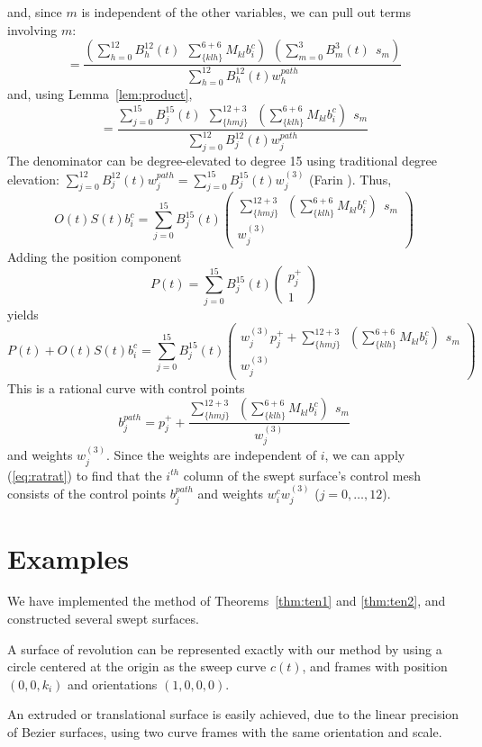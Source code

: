 and, since $m$ is independent of the other variables, 
we can pull out terms involving $m$:
\[
 = \frac{(\sum_{h=0}^{12} B_h^{12}(t) \ \ \sum_{\{klh\}}^{6+6} M_{kl} b_i^c) 
	\ \ (\sum_{m=0}^3 B_m^3(t) \ \ s_m)}
     {\sum_{h=0}^{12} B_h^{12}(t) w_h^{path}}
\]
and, using Lemma~\ref{lem:product},
\[
= \frac{\sum_{j=0}^{15} B_j^{15}(t) \ \ \sum_{\{hmj\}}^{12+3} \ \ 
		(\sum_{\{klh\}}^{6+6} M_{kl} b_i^c) \ \ s_m}
     {\sum_{j=0}^{12} B_j^{12}(t) w_j^{path}}
\]
The denominator can be degree-elevated to degree 15 using 
traditional degree elevation:
$\sum_{j=0}^{12} B_j^{12}(t) w_j^{path} = 
 \sum_{j=0}^{15} B_j^{15}(t) w^{(3)}_j$ (Farin \cite{farin93}).
Thus,
\[
O(t)S(t)b_i^c = \sum_{j=0}^{15} B_j^{15}(t) 
	\left(	\begin{array}{c}
	\sum_{\{hmj\}}^{12+3} \ \ 
		(\sum_{\{klh\}}^{6+6} M_{kl} b_i^c) \ \ s_m
	\\ w^{(3)}_j
	\end{array} \right)
\]
Adding the position component
\[
P(t) = 	\sum_{j=0}^{15} B_j^{15}(t) 
	\left(	\begin{array}{c}
	p_j^{+} \\ 1
	\end{array} \right)
\]
yields
\[
P(t) + O(t)S(t)b_i^c = 
\sum_{j=0}^{15} B_j^{15}(t) 
	\left(	\begin{array}{c}
	w^{(3)}_j p_j^{+} + 
	\sum_{\{hmj\}}^{12+3} \ \ 
		(\sum_{\{klh\}}^{6+6} M_{kl} b_i^c) \ \ s_m
	\\ w^{(3)}_j
	\end{array} \right)
\]
This is a rational curve with control points
\[
	b_j^{path} = p_j^{+} + \frac{\sum_{\{hmj\}}^{12+3} \ \ 
		(\sum_{\{klh\}}^{6+6} M_{kl} b_i^c) \ \ s_m}{w^{(3)}_j}
\]
and weights $w^{(3)}_j$.
Since the weights are independent of $i$, we can apply (\ref{eq:ratrat})
to find that the $i^{th}$ column of the swept surface's control mesh
consists of the control points $b_j^{path}$ and weights 
$w_i^c  w^{(3)}_j$ ($j=0,\ldots,12$).
\QED

\section{Examples}
\label{sec:eg}

We have implemented the method of Theorems~\ref{thm:ten1} and \ref{thm:ten2},
and constructed several swept surfaces.

\begin{rmk}
A surface of revolution can be represented exactly with our method
by using a circle 
centered at the origin
as the sweep curve $c(t)$, and frames with position $(0,0,k_i)$ and 
orientations $(1,0,0,0)$.

An extruded  or translational surface is easily achieved, due to
the linear precision of Bezier surfaces, using two curve frames
with the same orientation and scale.
\end{rmk}

